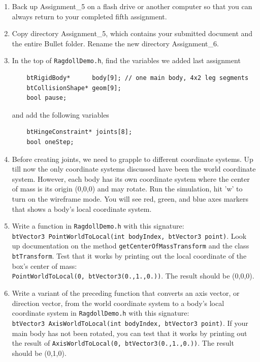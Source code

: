 \documentclass[12pt]{article}
\begin{document}
\begin{enumerate}

\item Back up Assignment\_5 on a flash drive or another computer so that you can always return to your completed fifth assignment.

\item Copy directory Assignment\_5, which contains your submitted document and the entire Bullet folder. Rename the new directory Assignment\_6.

\item In the top of \verb|RagdollDemo.h|, find the variables we added last assignment
\begin{verbatim}
    btRigidBody*      body[9]; // one main body, 4x2 leg segments
    btCollisionShape* geom[9];
    bool pause;
\end{verbatim}
and add the following variables
\begin{verbatim}
    btHingeConstraint* joints[8];
    bool oneStep;
\end{verbatim}

\item Before creating joints, we need to grapple to different
  coordinate systems.  Up till now the only coordinate systems
  discussed have been the world coordinate system.  However, each body
  has its own coordinate system where the center of mass is its origin
  (0,0,0) and may rotate.  Run the simulation, hit 'w' to turn on the
  wireframe mode.  You will see red, green, and blue axes markers that
  shows a body's local coordinate system.

\item Write a function in \verb|RagdollDemo.h| with this signature:
  \\\verb|btVector3 PointWorldToLocal(int bodyIndex, btVector3 point)|.
  Look up documentation on the method \verb|getCenterOfMassTransform|
  and the class \verb|btTransform|.  Test that it works by printing
  out the local coordinate of the box's center of mass:
  \\\verb|PointWorldToLocal(0, btVector3(0.,1.,0.))|.  The result
  should be (0,0,0).

\item Write a variant of the preceding function that converts an axis
  vector, or direction vector, from the world coordinate system to a
  body's local coordinate system in \verb|RagdollDemo.h| with this
  signature:
  \\\verb|btVector3 AxisWorldToLocal(int bodyIndex, btVector3 point)|.
  If your main body has not been rotated, you can test that it works
  by printing out the result of
  \verb|AxisWorldToLocal(0, btVector3(0.,1.,0.))|.  The result should
  be (0,1,0).



\end{enumerate}
\end{document}
